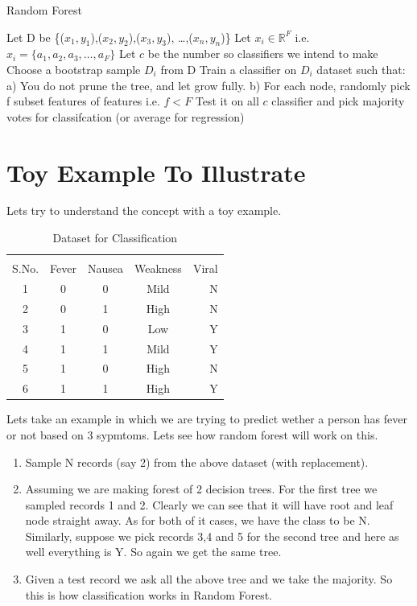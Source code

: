 \documentclass[journal]{IEEEtran}
\begin{document}
\begin{algorithm}
\renewcommand\thealgorithm{}
\caption{Random Forest}\label{RandomForest}
\begin{algorithmic}[1]
	\State Let D be \{($x_1,y_1$),($x_2,y_2$),($x_3,y_3$), \ldots ,($x_n,y_n$)\}	
	\State Let $x_i \in \mathbb{R}^F$  i.e. $x_i = \{a_1, a_2,a_3, \ldots,a_F\}$
	\State Let $c$ be the number so classifiers we intend to make
		\State Choose a bootstrap sample $D_i$ from D
		\State Train a classifier on $D_i$ dataset such that:
		\State \hspace{\algorithmicindent} a) You do not prune the tree, and let grow fully.
		\State \hspace{\algorithmicindent} b) For each node, randomly pick f subset features of 
		\State \hspace{\algorithmicindent} features i.e. $f < F$
	\EndFor
		\State Test it on all $c$ classifier and pick majority 
		\State votes for classifcation (or average for regression)
	\EndFor
 \end{algorithmic}
\end{algorithm}	

\section{Toy Example To Illustrate}
Lets try to understand the concept with a toy example.
		\begin{table}[h]
			\caption{Dataset for Classification} 
			\centering
			\begin{tabular}{cccc| r}
				\hline \\
				S.No. & Fever & Nausea & Weakness & Viral \\
				\hline 
				1 & 0 & 0 & Mild & N \\
				2 & 0 & 1 & High & N \\
				3 & 1 & 0 & Low & Y \\
				4 & 1 & 1 & Mild & Y \\
				5 & 1 & 0 & High & N \\
				6 & 1 & 1 & High & Y \\
				\hline
			\end{tabular}	
		\end{table}	
Lets take an example in which we are trying to predict wether a person has fever or not based on 3 sypmtoms. Lets see how random forest will work on this.
\begin{enumerate}[Step 1:]
	\item Sample N records (say 2) from the above dataset (with replacement).
	\item Assuming we are making forest of 2 decision trees. For the first tree we sampled records 1 and 2. Clearly we can see that it will have root and leaf node straight away. As for both of it cases, we have the class to be N.\\
	Similarly, suppose we pick records 3,4 and 5 for the second tree and here as well everything is Y. So again we get the same tree.
	\item Given a test record we ask all the above tree and we take the majority. So this is how classification works in Random Forest.
\end{enumerate}
\end{document}

